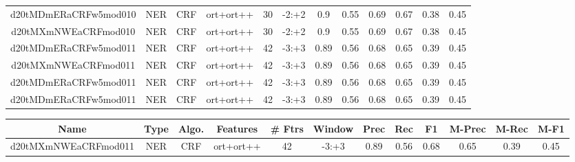 \documentclass[a4paper]{article}
\begin{document}
\begin{landscape}
\begin{center}
\begin{tabular}{ |c|c|c|c|c|c|c|c|c|c|c|c|}
 	
 
 	
 		
 		\small{ d20tMDmERaCRFw5mod010 } & NER & CRF & ort+ort++  &  30 &  -2:+2  &  0.9 & 0.55 & 0.69  &  0.67 & 0.38 & 0.45 \\
 		

 	
 
 	
 		
 		\small{ d20tMXmNWEaCRFmod010 } & NER & CRF & ort+ort++  &  30 &  -2:+2  &  0.9 & 0.55 & 0.69  &  0.67 & 0.38 & 0.45 \\
 		

 	
 
 	
 		
 		\small{ d20tMDmERaCRFw5mod011 } & NER & CRF & ort+ort++  &  42 &  -3:+3  &  0.89 & 0.56 & 0.68  &  0.65 & 0.39 & 0.45 \\
 		

 	
 
 	
 		
 		\small{ d20tMXmNWEaCRFmod011 } & NER & CRF & ort+ort++  &  42 &  -3:+3  &  0.89 & 0.56 & 0.68  &  0.65 & 0.39 & 0.45 \\
 		

 	
 
 	
 		
 		\small{ d20tMDmERaCRFw5mod011 } & NER & CRF & ort+ort++  &  42 &  -3:+3  &  0.89 & 0.56 & 0.68  &  0.65 & 0.39 & 0.45 \\
 		

 	
 
 	
 		
 		\small{ d20tMDmERaCRFw5mod011 } & NER & CRF & ort+ort++  &  42 &  -3:+3  &  0.89 & 0.56 & 0.68  &  0.65 & 0.39 & 0.45 \\
 		
 \hline
\end{tabular}
\end{center}




\begin{center}
\begin{tabular}{ |c|c|c|c|c|c|c|c|c|c|c|c|} 
 \hline
 	Name & Type & Algo. & Features & \# Ftrs & Window & Prec & Rec & F1 & M-Prec & M-Rec & M-F1\\
 \hline

 		

 	
 
 	
 		
 		\small{ d20tMXmNWEaCRFmod011 } & NER & CRF & ort+ort++  &  42 &  -3:+3  &  0.89 & 0.56 & 0.68  &  0.65 & 0.39 & 0.45 \\
 		


\end{tabular}
\end{center}
\end{landscape}
\end{document}
